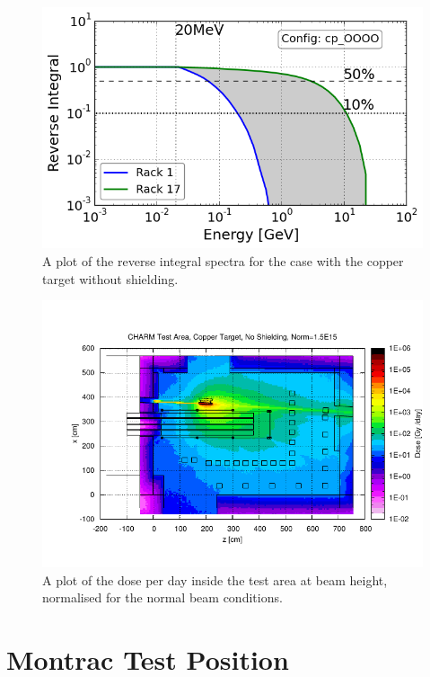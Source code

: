 \documentclass[main.tex]{subfiles}
\begin{document}
\begin{figure}[!ht]
	\centering
	\includegraphics[scale=0.6]{./images/rev_spectra_cp_OOOO}
	\caption{A plot of the reverse integral spectra for the case with the copper target without shielding.}
	\label{fig:cpOOOO_rev_spectra}
\end{figure}

\begin{figure}[!ht]
	\centering
	\includegraphics[width=\textwidth]{./images/dose_test_area_cpOOOO_norm}
	\caption{A plot of the dose per day inside the test area at beam height, normalised for the normal beam conditions.}
	\label{fig:cp_OOOO_dosemap}
\end{figure}

\clearpage
\section{Montrac Test Position}
\end{document}
